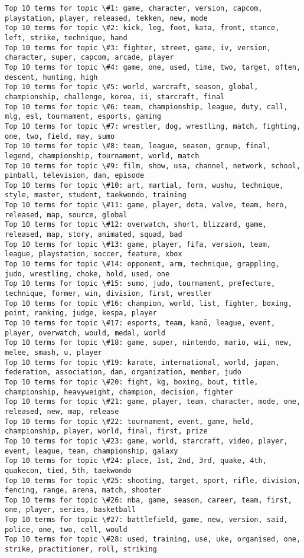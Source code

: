 \documentclass[11pt]{article}
\begin{document}
    \begin{Verbatim}[commandchars=\\\{\}]
Top 10 terms for topic \#1: game, character, version, capcom, playstation, player, released, tekken, new, mode
Top 10 terms for topic \#2: kick, leg, foot, kata, front, stance, left, strike, technique, hand
Top 10 terms for topic \#3: fighter, street, game, iv, version, character, super, capcom, arcade, player
Top 10 terms for topic \#4: game, one, used, time, two, target, often, descent, hunting, high
Top 10 terms for topic \#5: world, warcraft, season, global, championship, challenge, korea, ii, starcraft, final
Top 10 terms for topic \#6: team, championship, league, duty, call, mlg, esl, tournament, esports, gaming
Top 10 terms for topic \#7: wrestler, dog, wrestling, match, fighting, one, two, field, may, sumo
Top 10 terms for topic \#8: team, league, season, group, final, legend, championship, tournament, world, match
Top 10 terms for topic \#9: film, show, usa, channel, network, school, pinball, television, dan, episode
Top 10 terms for topic \#10: art, martial, form, wushu, technique, style, master, student, taekwondo, training
Top 10 terms for topic \#11: game, player, dota, valve, team, hero, released, map, source, global
Top 10 terms for topic \#12: overwatch, short, blizzard, game, released, map, story, animated, squad, bad
Top 10 terms for topic \#13: game, player, fifa, version, team, league, playstation, soccer, feature, xbox
Top 10 terms for topic \#14: opponent, arm, technique, grappling, judo, wrestling, choke, hold, used, one
Top 10 terms for topic \#15: sumo, judo, tournament, prefecture, technique, former, win, division, first, wrestler
Top 10 terms for topic \#16: champion, world, list, fighter, boxing, point, ranking, judge, kespa, player
Top 10 terms for topic \#17: esports, team, kanō, league, event, player, overwatch, would, medal, world
Top 10 terms for topic \#18: game, super, nintendo, mario, wii, new, melee, smash, u, player
Top 10 terms for topic \#19: karate, international, world, japan, federation, association, dan, organization, member, judo
Top 10 terms for topic \#20: fight, kg, boxing, bout, title, championship, heavyweight, champion, decision, fighter
Top 10 terms for topic \#21: game, player, team, character, mode, one, released, new, map, release
Top 10 terms for topic \#22: tournament, event, game, held, championship, player, world, final, first, prize
Top 10 terms for topic \#23: game, world, starcraft, video, player, event, league, team, championship, galaxy
Top 10 terms for topic \#24: place, 1st, 2nd, 3rd, quake, 4th, quakecon, tied, 5th, taekwondo
Top 10 terms for topic \#25: shooting, target, sport, rifle, division, fencing, range, arena, match, shooter
Top 10 terms for topic \#26: nba, game, season, career, team, first, one, player, series, basketball
Top 10 terms for topic \#27: battlefield, game, new, version, said, police, one, two, cell, would
Top 10 terms for topic \#28: used, training, use, uke, organised, one, strike, practitioner, roll, striking

    \end{Verbatim}
\end{document}
